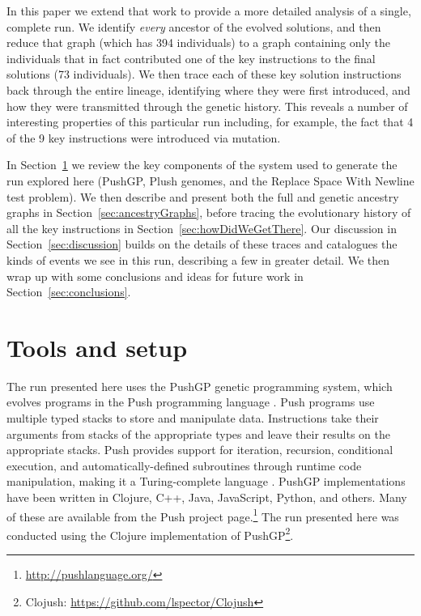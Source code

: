 In this paper we extend that work to provide a more detailed analysis of a
single, complete run. We identify \emph{every} ancestor of the evolved 
solutions, and
then reduce that graph (which has 394 individuals) to a graph containing only 
the individuals that in fact contributed one of the key instructions to 
the final solutions (73 individuals). We then trace each of these key solution
instructions back through the entire lineage, identifying where they were first
introduced, and how they were transmitted through the genetic history. This
reveals a number of interesting properties of this particular run including,
for example, the fact that 4 of the 9 key instructions were introduced via 
mutation.

In Section~\ref{sec:background} we review the key components of the system
used to generate the run explored here (PushGP, Plush genomes, and the Replace Space With Newline test problem). We then describe and present both the full
and genetic ancestry graphs in Section~\ref{sec:ancestryGraphs}, before
tracing the evolutionary history of all the key instructions in 
Section~\ref{sec:howDidWeGetThere}. Our discussion in 
Section~\ref{sec:discussion} builds on the details of these traces and
catalogues the kinds of events we see in this run, describing a few in greater
detail. We then wrap up with some conclusions and ideas for future work in
Section~\ref{sec:conclusions}.

\section{Tools and setup}
\label{sec:background}

The run presented here uses the PushGP genetic programming system, which evolves programs in the Push programming language \citep{spector:2002:GPEM, 1068292}. Push programs use multiple typed stacks to store and manipulate data. Instructions take their arguments from stacks of the appropriate types and leave their results on the appropriate stacks. Push provides support for iteration, recursion, conditional execution, and automatically-defined subroutines through runtime code manipulation, making it a Turing-complete language \citep{1068292}. PushGP implementations have been written in Clojure, C++, Java, JavaScript, Python, and others. Many of these are available from the Push project page.\footnote{\url{http://pushlanguage.org/}} The run presented here was conducted using the Clojure implementation of PushGP\footnote{Clojush: \url{https://github.com/lspector/Clojush}}.

